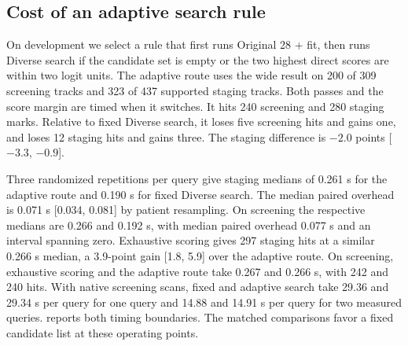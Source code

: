 \subsection{Cost of an adaptive search rule}
On development we select a rule that first runs Original 28 + fit, then runs Diverse search if the candidate set is empty or the two highest direct scores are within two logit units. The adaptive route uses the wide result on 200 of 309 screening tracks and 323 of 437 supported staging tracks. Both passes and the score margin are timed when it switches. It hits 240 screening and 280 staging marks. Relative to fixed Diverse search, it loses five screening hits and gains one, and loses 12 staging hits and gains three. The staging difference is $-2.0$ points [$-3.3$, $-0.9$].

Three randomized repetitions per query give staging medians of 0.261 s for the adaptive route and 0.190 s for fixed Diverse search. The median paired overhead is 0.071 s [0.034, 0.081] by patient resampling. On screening the respective medians are 0.266 and 0.192 s, with median paired overhead 0.077 s and an interval spanning zero. Exhaustive scoring gives 297 staging hits at a similar 0.266 s median, a 3.9-point gain [1.8, 5.9] over the adaptive route. On screening, exhaustive scoring and the adaptive route take 0.267 and 0.266 s, with 242 and 240 hits. With native screening scans, fixed and adaptive search take 29.36 and 29.34 s per query for one query and 14.88 and 14.91 s per query for two measured queries.  reports both timing boundaries. The matched comparisons favor a fixed candidate list at these operating points.

\begin{table}[!t]
\centering\small
\caption{Matched cost of fixed and adaptive routes. Hit counts use the full cohorts. Local values are median / p90 seconds over the median of three randomized runs per query. The native screening replay measures one query on eight pairs and two distinct queries on four of those pairs. Native values are medians in seconds per query.}
\label{tab:decision-cost}

\end{table}
